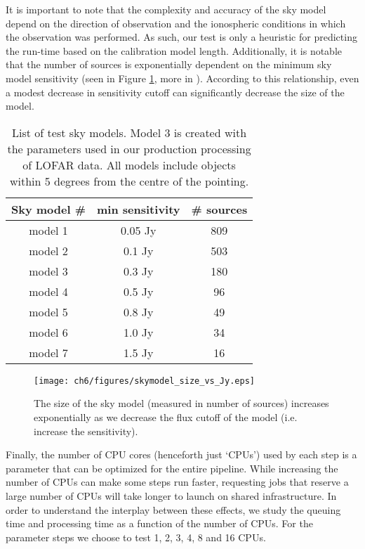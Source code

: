 It is important to note that the complexity and accuracy of the sky model depend on the direction of observation and the ionospheric conditions in which the observation was performed. As such, our test is only a heuristic for predicting the run-time based on the calibration model length. Additionally, it is notable that the number of sources is exponentially dependent on the minimum sky model sensitivity (seen in Figure \ref{fig:ch6_skymodel_size}, more in \citealt{tgssadr,Wendy_bootes}). According to this relationship, even a modest decrease in sensitivity cutoff can significantly decrease the size of the model.

\begin{table}[!ht]
\centering
\begin{tabular}{||c| c | c||} 
 \hline
 Sky model \# & min sensitivity & \# sources  \\ [0.5ex] 
 \hline
 model 1 & 0.05 Jy & 809    \\ 
 model 2 & 0.1 Jy & 503   \\
 \rowcolor{Gray}
  \hline
 model 3 & 0.3 Jy & 180   \\
  \hline
 model 4 & 0.5 Jy & 96  \\
 model 5 & 0.8 Jy & 49   \\ 
 model 6 & 1.0 Jy & 34   \\
 model 7 & 1.5 Jy & 16   \\[1ex] 
 \hline
\end{tabular}
    \caption[List of test sky models]{List of test sky models. Model 3 is created with the parameters used in our production processing of LOFAR data. All models include objects within 5 degrees from the centre of the pointing.  }
\label{table:skymodels}
\end{table}


\begin{figure}
    \texttt{[image: ch6/figures/skymodel\_size\_vs\_Jy.eps]}
      \caption{The size of the sky model (measured in number of sources) increases exponentially as we decrease the flux cutoff of the model (i.e. increase the sensitivity).}
	\label{fig:ch6_skymodel_size}
\end{figure}


Finally, the number of CPU cores (henceforth just `CPUs') used by each step is a parameter that can be optimized for the entire pipeline. While increasing the number of CPUs can make some steps run faster, requesting jobs that reserve a large number of CPUs will take longer to launch on shared infrastructure. In order to understand the interplay between these effects, we study the queuing time and processing time as a function of the number of CPUs. For the parameter steps we choose to test 1, 2, 3, 4, 8 and 16 CPUs. 

